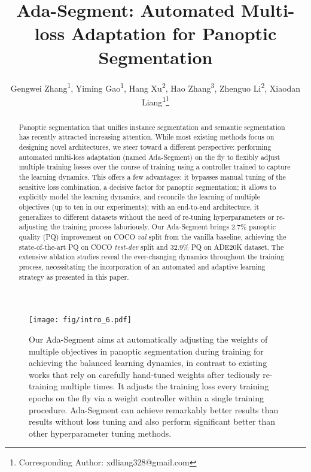 \documentclass[letterpaper]{article} \usepackage{aaai21}  \usepackage{times}  \usepackage{helvet} \usepackage{courier}  \usepackage[hyphens]{url}  \usepackage{graphicx} \urlstyle{rm} \def\UrlFont{\rm}  \usepackage{natbib}  \usepackage{caption} \frenchspacing  \setlength{\pdfpagewidth}{8.5in}  \setlength{\pdfpageheight}{11in}
\title{Ada-Segment: Automated Multi-loss Adaptation for Panoptic Segmentation}
\author{Gengwei Zhang\textsuperscript{\rm 1}, 
Yiming Gao\textsuperscript{\rm 1}, 
Hang Xu\textsuperscript{\rm 2}, 
Hao Zhang\textsuperscript{\rm 3}, 
Zhenguo Li\textsuperscript{\rm 2}, 
Xiaodan Liang\textsuperscript{\rm 1}\thanks{Corresponding Author: xdliang328@gmail.com} \\ 
}
\begin{document}
\maketitle


\begin{abstract}
    Panoptic segmentation that unifies instance segmentation 
    and semantic segmentation has recently attracted increasing attention. 
While most existing methods focus on 
designing novel architectures,
    we steer toward a different perspective: 
    performing automated multi-loss adaptation (named Ada-Segment) on the fly to flexibly adjust multiple 
    training losses over the course of training using a controller trained to capture the learning dynamics. 
    This offers a few advantages: 
    it bypasses manual tuning of the sensitive loss combination,
a decisive factor for panoptic segmentation; 
    it allows to explicitly model the learning dynamics, 
    and reconcile the learning of multiple objectives (up to ten in our experiments);
with an end-to-end architecture, 
    it generalizes to different datasets without the need of re-tuning hyperparameters or 
    re-adjusting the training process laboriously. 
    Our Ada-Segment brings 2.7\% panoptic quality (PQ) improvement on COCO \textit{val} split 
    from the vanilla baseline, 
    achieving the state-of-the-art  PQ on COCO \textit{test-dev} split 
    and 32.9\% PQ on ADE20K dataset.
The extensive ablation studies reveal the ever-changing dynamics 
    throughout the training process, 
    necessitating the incorporation of an automated and adaptive learning strategy as presented 
    in this paper. 
\end{abstract}

\begin{figure}[t]
    \centering
\texttt{[image: fig/intro\_6.pdf]}
\caption{Our Ada-Segment aims at automatically adjusting the weights of multiple objectives 
    in panoptic segmentation during training for achieving the balanced learning dynamics, 
    in contrast to existing works that rely on carefully hand-tuned weights after tediously re-training 
    multiple times. 
    It adjusts the training loss every training epochs on the fly via a weight controller 
    within a single training procedure. 
    Ada-Segment can achieve remarkably better results than results without loss tuning 
    and also perform significant better than other hyperparameter tuning methods. }
\label{intro2}
\end{figure}
\end{document}

